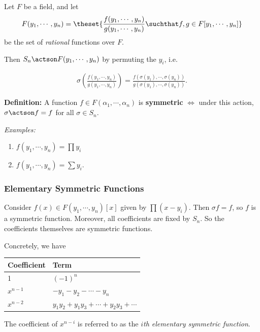 Let \(F\) be a field, and let
\begin{align*}
F(y_1, \cdots , y_n) = \theset{\frac{f(y_1, \cdots, y_n)}{g(y_1, \cdots, y_n)} \suchthat f, g \in F[y_1, \cdots, y_n]}
\end{align*} be the set of \emph{rational} functions over \(F\).

Then \(S_n \actson F(y_1, \cdots, y_n)\) by permuting the \(y_i\), i.e.

\begin{align*}
\sigma \left(\frac{
f(y_1, \cdots, y_n)
}{
g(y_1, \cdots, y_n)
}\right) = \frac{
f(\sigma(y_1), \cdots, \sigma(y_n))
}{
g(\sigma(y_1), \cdots, \sigma(y_n))
}
.\end{align*}

\textbf{Definition:} A function \(f \in F(\alpha_1, \cdots, \alpha_n)\)
is \textbf{symmetric} \(\iff\) under this action,
\(\sigma\actson f = f\) for all \(\sigma \in S_n\).

\emph{Examples:}

\begin{enumerate}
\def\labelenumi{\arabic{enumi}.}
\tightlist
\item
  \(f(y_1, \cdots, y_n) = \prod y_i\)
\item
  \(f(y_1, \cdots, y_n) = \sum y_i\).
\end{enumerate}

\hypertarget{elementary-symmetric-functions}{%
\subsubsection{Elementary Symmetric
Functions}\label{elementary-symmetric-functions}}

Consider \(f(x) \in F(y_1, \cdots, y_n)[x]\) given by \(\prod (x-y_i)\).
Then \(\sigma f = f\), so \(f\) is a symmetric function. Moreover, all
coefficients are fixed by \(S_n\). So the coefficients themselves are
symmetric functions.

Concretely, we have

\begin{longtable}[]{@{}ll@{}}
\toprule
Coefficient & Term\tabularnewline
\midrule
\endhead
1 & \((-1)^n\)\tabularnewline
\(x^{n-1}\) & \(-y_1 - y_2 - \cdots - y_n\)\tabularnewline
\(x^{n-2}\) &
\(y_1y_2 + y_1y_3 + \cdots + y_2y_3 + \cdots\)\tabularnewline
\bottomrule
\end{longtable}

The coefficient of \(x^{n-i}\) is referred to as the \emph{\(i\)th
elementary symmetric function}.

